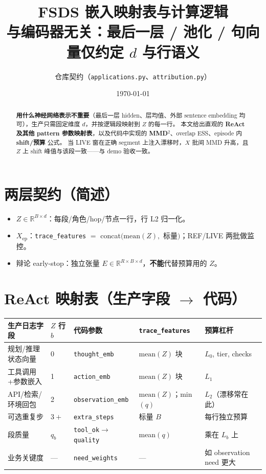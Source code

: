 \documentclass[11pt,a4paper]{ctexart}
\title{FSDS 嵌入映射表与计算逻辑\\[0.2em]
\large 与编码器无关：最后一层 / 池化 / 句向量仅约定 $d$ 与行语义}
\author{仓库契约（\texttt{applications.py}、\texttt{attribution.py}）}
\date{\today}
\begin{document}
\maketitle

\begin{abstract}
\textbf{用什么神经网络表示不重要}（最后一层 hidden、层均值、外部 sentence embedding 均可），生产只需固定维度 $d$，并按逻辑段映射到 $Z$ 的每一行。
本文给出直观的 \textbf{ReAct 及其他 pattern 参数映射表}，以及代码中实现的 \textbf{MMD}$^2$、overlap ESS、episode 内 \textbf{shift/预算} 公式。
当 LIVE 窗在正确 segment 上注入漂移时，$X$ 批间 MMD 升高，且 $Z$ 上 shift 峰值与该段一致——与 demo 验收一致。
\end{abstract}

\section{两层契约（简述）}
\begin{itemize}[nosep]
  \item $Z\in\mathbb{R}^{B\times d}$：每段/角色/hop/节点一行，行 L2 归一化。
  \item $X_{\mathrm{ep}}$：\texttt{trace\_features} $=$ concat$(\mathrm{mean}(Z),$ 标量$)$；REF/LIVE 两批做监控。
  \item 辩论 early-stop：独立张量 $E\in\mathbb{R}^{R\times B\times d}$，\textbf{不能}代替预算用的 $Z$。
\end{itemize}

\section{ReAct 映射表（生产字段 $\rightarrow$ 代码）}
\label{tab:react-map-zh}

\begin{center}
\small
\begin{tabular}{@{}p{}p{}p{}p{}p{}@{}}
\toprule
生产日志字段 & $Z$ 行 $b$ & 代码参数 & \texttt{trace\_features} & 预算杠杆 \\
\midrule
规划/推理状态向量 & 0 & \texttt{thought\_emb} & $\mathrm{mean}(Z)$ 块 & $L_0$, tier, checks \\
工具调用+参数嵌入 & 1 & \texttt{action\_emb} & $\mathrm{mean}(Z)$ 块 & $L_1$ \\
API/检索/环境回包 & 2 & \texttt{observation\_emb} & $\mathrm{mean}(Z)$；min$(q)$ & $L_2$（漂移常在此） \\
可选重复步 & $3+$ & \texttt{extra\_steps} & 标量 $B$ & 每行独立预算 \\
段质量 & $q_b$ & \texttt{tool\_ok}$\rightarrow$\texttt{quality} & mean$(q)$ & 乘在 $L_b$ 上 \\
业务关键度 & --- & \texttt{need\_weights} & --- & 如 observation need 更大 \\
\bottomrule
\end{tabular}
\end{center}
\end{document}
